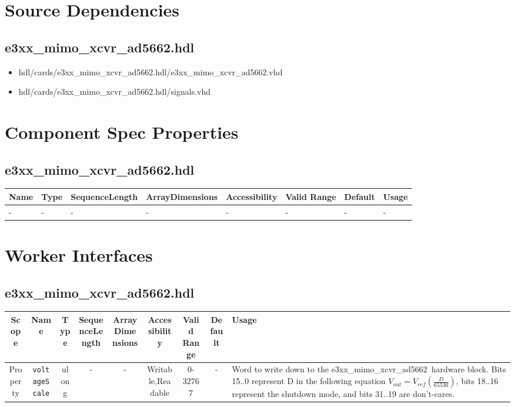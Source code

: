\documentclass{article}
\def\comp{e3xx\_mimo\_xcvr\_ad5662}
\def\comp{e3xx\_mimo\_xcvr\_ad5662}
\begin{document}
\section*{Source Dependencies}
\subsection*{\comp.hdl}
\begin{itemize}
	\item hdl/cards/\comp.hdl/\comp.vhd
	\item hdl/cards/\comp.hdl/signals.vhd
\end{itemize}

\begin{landscape}
\section*{Component Spec Properties}
	\subsection*{\comp.hdl}
    \begin{scriptsize}
    	\begin{tabular}{|p{3.75cm}|p{1.25cm}|p{2cm}|p{2.75cm}|p{1.5cm}|p{1.5cm}|p{1cm}|p{6.23cm}|}
        \hline
        \rowcolor{blue}
        Name & Type & SequenceLength & ArrayDimensions & Accessibility & Valid Range & Default & Usage \\
        \hline
        - & - & - & - & - & - & - & - \\
        \hline
        \end{tabular}
    \end{scriptsize}

\section*{Worker Interfaces}
	\subsection*{\comp.hdl}
	\begin{scriptsize}
		\begin{tabular}{|c|c|c|c|c|c|c|c|p{8.5cm}|}
			\hline
			\rowcolor{blue}
			Scope        & Name                 & Type  & SequenceLength & ArrayDimensions & Accessibility     & Valid Range & Default & Usage \\
			\hline
			Property     & \verb+voltageScale+  & ulong & -              & -               & Writable,Readable & 0-32767     & -       & Word to write down to the \comp\ hardware block. Bits 15..0 represent D in the following equation \(V_{out}=V_{ref} (\frac{D}{65536})\), bits 18..16 represent the shutdown mode, and bits 31..19 are don't-cares.    \\
			\hline
		\end{tabular}
	\end{scriptsize}


\end{landscape}
\end{document}

